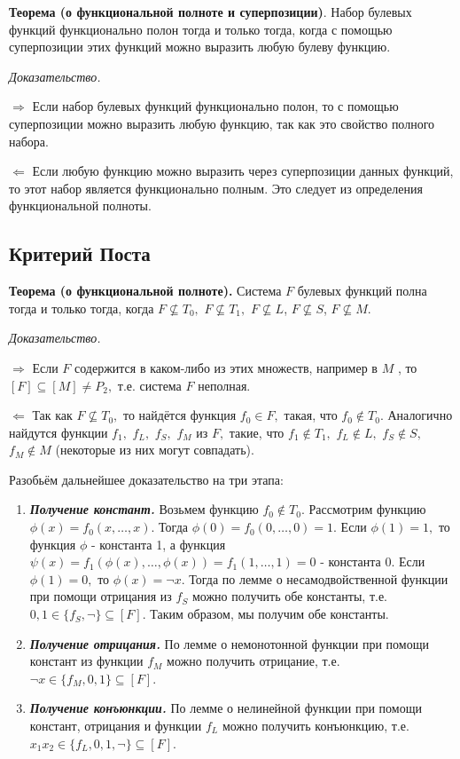 \documentclass[12pt,letterpaper]{article}
\begin{document}
\textbf{Теорема (о функциональной полноте и суперпозиции)}. Набор булевых функций функционально полон тогда и только тогда, когда с помощью суперпозиции этих функций можно выразить любую булеву функцию.

\textit{Доказательство.}

\(\Rightarrow\) Если набор булевых функций функционально полон, то с помощью суперпозиции можно выразить любую функцию, так как это свойство полного набора.

\(\Leftarrow\) Если любую функцию можно выразить через суперпозиции данных функций, то этот набор является функционально полным. Это следует из определения функциональной полноты.

\subsection{Критерий Поста}

\textbf{Теорема (о функциональной полноте).} Система \(F\) булевых функций полна тогда и только тогда, когда \(F \not\subseteq T_0,\) \(F \not\subseteq T_1,\) \(F \not\subseteq L\), \(F \not\subseteq S\), \(F \not\subseteq M\).

\textit{Доказательство.}

\(\Rightarrow\) Если \(F\) содержится в каком-либо из этих множеств, например в \(M\) , то \(\left[ F \right] \subseteq \left[ M \right] \neq P_2,\) т.е. система \(F\) неполная.

\(\Leftarrow\) Так как \(F \not\subseteq T_0,\) то найдётся функция \(f_0 \in F,\) такая, что \(f_0 \not\in T_0.\) Аналогично найдутся функции \(f_1,\) \(f_L,\) \(f_S,\) \(f_M\) из \(F,\) такие, что \(f_1 \not\in T_1,\) \(f_L \not\in L,\) \(f_S \not\in S,\) \(f_M \not\in M\) (некоторые из них могут совпадать).

Разобьём дальнейшее доказательство на три этапа:

\begin{enumerate}
  \item \textbf{\emph{Получение констант.}} Возьмем функцию \(f_0 \not\in T_0.\) Рассмотрим функцию \(\phi(x) = f_0(x, \ldots, x).\) Тогда \(\phi(0) = f_0(0, \ldots, 0) = 1.\) Если \(\phi(1) = 1,\) то функция \(\phi\) - константа 1, а функция \(\psi(x) = f_1(\phi(x), \ldots, \phi(x)) = f_1(1, \ldots, 1) = 0\) - константа 0. Если \(\phi(1) = 0,\) то \(\phi(x) = \neg x.\) Тогда по лемме о несамодвойственной функции при помощи отрицания из \(f_S\) можно получить обе константы, т.е. \(0, 1 \in \{f_S, \neg\} \subseteq \left[ F \right].\) Таким образом, мы получим обе константы.
  \item \textbf{\emph{Получение отрицания.}} По лемме о немонотонной функции при помощи констант из функции \(f_M\) можно получить отрицание, т.е. \(\neg x \in \{f_M, 0, 1\} \subseteq \left[ F \right].\)
  \item \textbf{\emph{Получение конъюнкции.}} По лемме о нелинейной функции при помощи констант, отрицания и функции \(f_L\) можно получить конъюнкцию, т.е. \(x_1 x_2 \in \{f_L, 0, 1, \neg\} \subseteq \left[ F \right].\)
\end{enumerate}
\end{document}
